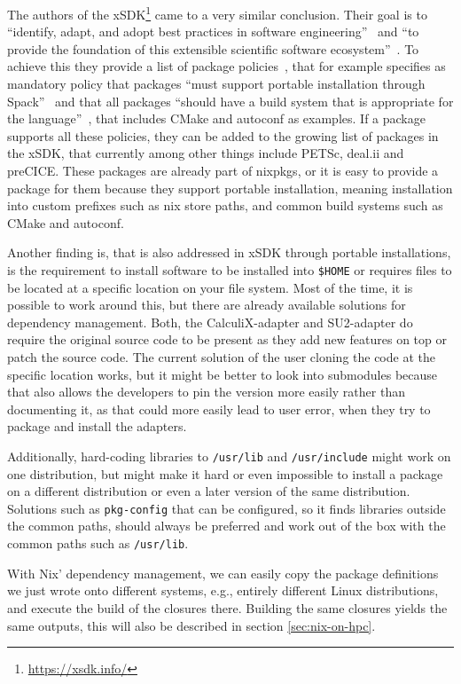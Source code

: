 \documentclass{eceasst}
\begin{document}
The authors of the xSDK\footnote{\url{https://xsdk.info/}} came to a very similar conclusion.
Their goal is to ``identify, adapt, and adopt best practices in software engineering''~\cite{xsdk-website} and ``to provide the foundation of this extensible scientific software ecosystem''~\cite{xsdk-website}.
To achieve this they provide a list of package policies~\cite{xSDK2023}, that for example specifies as mandatory policy that packages ``must support portable installation through Spack''~\cite{xSDK2023} and that all packages ``should have a build system that is appropriate for the language''~\cite{xSDK2023}, that includes CMake and autoconf as examples.
If a package supports all these policies, they can be added to the growing list of packages in the xSDK, that currently among other things include PETSc, deal.ii and preCICE.
These packages are already part of nixpkgs, or it is easy to provide a package for them because they support portable installation, meaning installation into custom prefixes such as nix store paths, and common build systems such as CMake and autoconf.

Another finding is, that is also addressed in xSDK through portable installations, is the requirement to install software to be installed into \texttt{\$HOME} or requires files to be located at a specific location on your file system.
Most of the time, it is possible to work around this, but there are already available solutions for dependency management.
Both, the CalculiX-adapter and SU2-adapter do require the original source code to be present as they add new features on top or patch the source code.
The current solution of the user cloning the code at the specific location works, but it might be better to look into submodules because that also allows the developers to pin the version more easily rather than documenting it, as that could more easily lead to user error, when they try to package and install the adapters.

Additionally, hard-coding libraries to \texttt{/usr/lib} and \texttt{/usr/include} might work on one distribution, but might make it hard or even impossible to install a package on a different distribution or even a later version of the same distribution.
Solutions such as \texttt{pkg-config} that can be configured, so it finds libraries outside the common paths, should always be preferred and work out of the box with the common paths such as \texttt{/usr/lib}.

With Nix' dependency management, we can easily copy the package definitions we just wrote onto different systems, e.g., entirely different Linux distributions, and execute the build of the closures there.
Building the same closures yields the same outputs, this will also be described in section \ref{sec:nix-on-hpc}.
\end{document}
